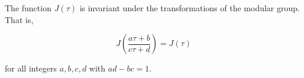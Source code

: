 The function $J(\tau)$ is invariant under the transformations of the modular group. That is,

$$J\left(\frac{a\tau + b}{c\tau + d}\right) = J(\tau)$$

for all integers $a, b, c, d$ with $ad - bc = 1$.
